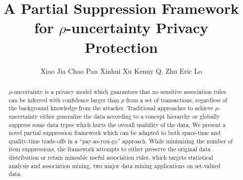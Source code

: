 \documentclass[prodmode,acmtkdd]{acmsmall} %
\begin{document}

\title{A Partial Suppression Framework for $\rho$-uncertainty Privacy
Protection}


%
%
%


\author{Xiao Jia
Chao Pan
Xinhui Xu
Kenny Q. Zhu
Eric Lo
}

\begin{abstract}
$\rho$-uncertainty is a privacy model which guarantees that
no sensitive association rules can be inferred with confidence
larger than $\rho$ from a set of transactions, regardless of
the background knowledge from the attacker.
Traditional approaches to achieve $\rho$-uncertainty either
generalize the data according to a concept hierarchy or globally
suppress some data types which hurts the overall usability of the 
data. We present a novel partial suppression framework
which can be adapted to both space-time and quality-time 
trade-offs in a ``pay-as-you-go'' approach.
While minimizing the number of item suppressions, the framework attempts to
either preserve the original data distribution or retain mineable useful
association rules,
which targets statistical analysis and association mining,
two major data mining applications on set-valued data.
\end{abstract}

\end{document}
